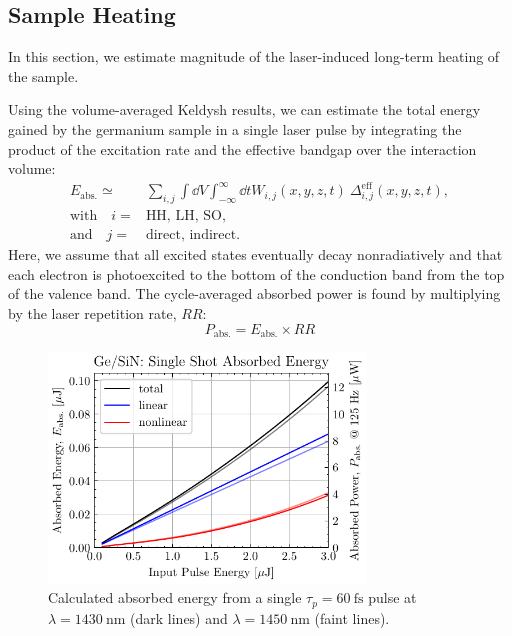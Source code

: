 \subsection{Sample Heating}
\label{sec:sample_heating}

In this section, we estimate magnitude of the laser-induced long-term heating of the sample. 

Using the volume-averaged Keldysh results, we can estimate the total energy gained by the germanium sample in a single laser pulse by integrating the product of the excitation rate and the effective bandgap over the interaction volume:
\begin{equation}
\begin{split}
E_{\textrm{abs.}} \simeq {}& \sum_{i,j} \int \dd{V} \int_{-\infty}^{\infty} \dd{t} W_{i,j} (x, y, z, t) \ \Delta_{i,j}^{\textrm{eff}}(x,y,z,t), \\
\textrm{with} \quad i={}&\textrm{HH, LH, SO}, \\
\textrm{and} \quad j={}&\textrm{direct, indirect.}
\end{split}
\label{eqn:absorbed_energy}
\end{equation}
Here, we assume that all excited states eventually decay nonradiatively and that each electron is photoexcited to the bottom of the conduction band from the top of the valence band. The cycle-averaged absorbed power is found by multiplying by the laser repetition rate, $RR$:
\begin{equation}
P_{\textrm{abs.}} = E_{\textrm{abs.}} \times RR
\label{eqn:absorbed_power}
\end{equation}

\begin{figure}
	\centering
	\includegraphics[width=0.75\textwidth]{figures/chap4/Single_shot_abs_ener.pdf}
	\caption{Calculated absorbed energy from a single $\tau_p = 60 \ \textrm{fs}$ pulse at $\lambda=1430 \ \textrm{nm}$ (dark lines) and $\lambda = 1450 \ \textrm{nm}$ (faint lines).}
	\label{fig:Single_shot_abs_ener}
\end{figure}

